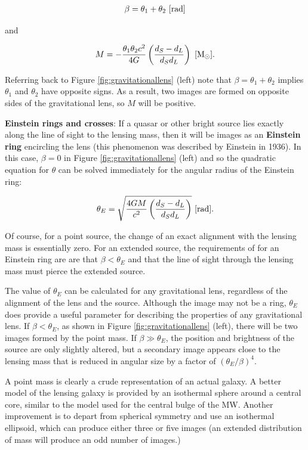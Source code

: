 \documentclass[a4paper,10pt]{article}
\begin{document}
\begin{align*}
    \beta = \theta_1 + \theta_2 ~ [{\rm rad}]
\end{align*}

{\noindent}and

\begin{align*}
    M = -\frac{\theta_1\theta_2c^2}{4G} \left(\frac{d_S-d_L}{d_Sd_L}\right) ~ [{\rm M_\odot}].
\end{align*}

{\noindent}Referring back to Figure \ref{fig:gravitationallens} (left) note that $\beta=\theta_1+\theta_2$ implies $\theta_1$ and $\theta_2$ have opposite signs. As a result, two images are formed on opposite sides of the gravitational lens, so $M$ will be positive.

{\noindent}\textbf{Einstein rings and crosses}: If a quasar or other bright source lies exactly along the line of sight to the lensing mass, then it will be images as an \textbf{Einstein ring} encircling the lens (this phenomenon was described by Einstein in 1936). In this case, $\beta=0$ in Figure \ref{fig:gravitationallens} (left) and so the quadratic equation for $\theta$ can be solved immediately for the angular radius of the Einstein ring:

\begin{align*}
    \theta_E = \sqrt{\frac{4GM}{c^2} \left(\frac{d_S-d_L}{d_Sd_L}\right)} ~ [{\rm rad}].
\end{align*}

{\noindent}Of course, for a point source, the change of an exact alignment with the lensing mass is essentially zero. For an extended source, the requirements of for an Einstein ring are are that $\beta<\theta_E$ and that the line of sight through the lensing mass must pierce the extended source. 

{\noindent}The value of $\theta_E$ can be calculated for any gravitational lens, regardless of the alignment of the lens and the source. Although the image may not be a ring, $\theta_E$ does provide a useful parameter for describing the properties of any gravitational lens. If $\beta<\theta_E$, as shown in Figure \ref{fig:gravitationallens} (left), there will be two images formed by the point mass. If $\beta\gg\theta_E$, the position and brightness of the source are only slightly altered, but a secondary image appears close to the lensing mass that is reduced in angular size by a factor of $(\theta_E/\beta)^4$.

{\noindent}A point mass is clearly a crude representation of an actual galaxy. A better model of the lensing galaxy is provided by an isothermal sphere around a central core, similar to the model used for the central bulge of the MW. Another improvement is to depart from spherical symmetry and use an isothermal ellipsoid, which can produce either three or five images (an extended distribution of mass will produce an odd number of images.)
\end{document}
